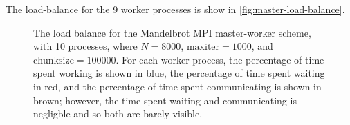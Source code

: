 \documentclass{article}
\begin{document}
The load-balance for the 9 worker processes is show in
\autoref{fig:master-load-balance}.
\begin{figure}[h]
  \centering
  \caption{The load balance for the Mandelbrot MPI master-worker scheme,
    with 10 processes, where $N = 8000$, $\mathrm{maxiter} = 1000$, and
    $\mathrm{chunksize} = 100000$. For each worker process, the percentage of
    time spent working is shown in blue, the percentage of time spent waiting in
    red, and the percentage of time spent communicating is shown in brown;
    however, the time spent waiting and communicating is negligble and so both
    are barely visible.}
  \label{fig:master-load-balance}
\end{figure}

\end{document}
